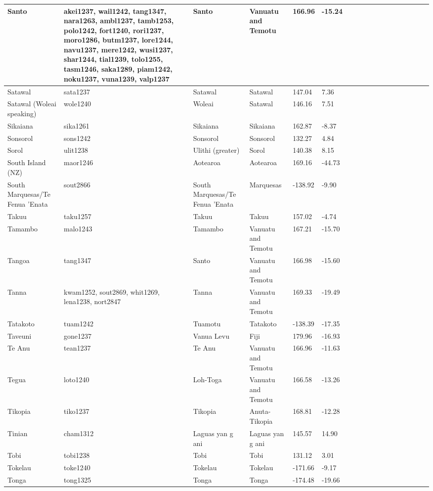 \documentclass[a4paper,10pt]{article} %
\begin{document}
\begin{landscape}
\begin{longtable}{| p{2.5cm} |  p{7cm} | p{2.5cm}  | p{2.5cm}  | p{2.5cm}  | p{2.5cm}  | p{2.5cm}  | p{2cm}  | p{1cm} | p{1cm}  | p{1cm} | p{1cm}  | p{1.5cm}  | p{1cm} | p{1cm}  | p{1cm}  |p{1cm}  | p{1cm}    |}
 Santo & akei1237, wail1242, tang1347, nara1263, ambl1237, tamb1253, polo1242, fort1240, rori1237, moro1286, butm1237, lore1244, navu1237, mere1242, wusi1237, shar1244, tial1239, tolo1255, tasm1246, saka1289, piam1242, noku1237, vuna1239, valp1237 & Santo & Vanuatu and Temotu & 166.96 & -15.24 \\ \hline
 Satawal & sata1237 & Satawal & Satawal & 147.04 & 7.36 \\ \hline
 Satawal (Woleai speaking) & wole1240 & Woleai & Satawal & 146.16 & 7.51 \\ \hline
 Sikaiana & sika1261 & Sikaiana & Sikaiana & 162.87 & -8.37 \\ \hline
 Sonsorol & sons1242 & Sonsorol & Sonsorol & 132.27 & 4.84 \\ \hline
 Sorol & ulit1238 & Ulithi (greater) & Sorol & 140.38 & 8.15 \\ \hline
 South Island (NZ) & maor1246 & Aotearoa & Aotearoa & 169.16 & -44.73 \\ \hline
 South Marquesas/Te Fenua 'Enata & sout2866 & South Marquesas/Te Fenua 'Enata  & Marquesas & -138.92 & -9.90 \\ \hline
 Takuu & taku1257 & Takuu & Takuu & 157.02 & -4.74 \\ \hline
 Tamambo & malo1243 & Tamambo & Vanuatu and Temotu & 167.21 & -15.70 \\ \hline
 Tangoa & tang1347 & Santo & Vanuatu and Temotu & 166.98 & -15.60 \\ \hline
 Tanna & kwam1252, sout2869, whit1269, lena1238, nort2847 & Tanna & Vanuatu and Temotu & 169.33 & -19.49 \\ \hline
 Tatakoto & tuam1242 & Tuamotu & Tatakoto & -138.39 & -17.35 \\ \hline
 Taveuni & gone1237 & Vanua Levu & Fiji & 179.96 & -16.93 \\ \hline
 Te Anu & tean1237 & Te Anu & Vanuatu and Temotu & 166.96 & -11.63 \\ \hline
 Tegua & loto1240 & Loh-Toga & Vanuatu and Temotu & 166.58 & -13.26 \\ \hline
 Tikopia & tiko1237 & Tikopia & Anuta-Tikopia & 168.81 & -12.28 \\ \hline
 Tinian & cham1312 & Laguas yan g ani & Laguas yan g ani & 145.57 & 14.90 \\ \hline
 Tobi & tobi1238 & Tobi & Tobi & 131.12 & 3.01 \\ \hline
 Tokelau & toke1240 & Tokelau & Tokelau & -171.66 & -9.17 \\ \hline
 Tonga & tong1325 & Tonga & Tonga & -174.48 & -19.66 \\ \hline

\end{longtable}
\end{landscape}
\end{document}
